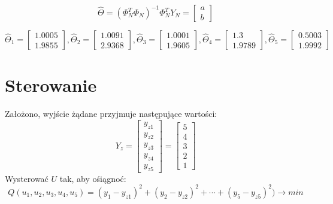 \documentclass{article}
\begin{document}
\begin{equation}
\widehat{\Theta} = (\Phi_N^T \Phi_N)^{-1} \Phi_N^T Y_N = \begin{bmatrix}
a \\  b
\end{bmatrix}
\end{equation}

\begin{equation}
\widehat{\Theta}_1 = \begin{bmatrix}
1.0005 \\ 1.9855
\end{bmatrix}
,
\widehat{\Theta}_2 = \begin{bmatrix}
1.0091 \\ 2.9368
\end{bmatrix}
,
\widehat{\Theta}_3 = \begin{bmatrix}
1.0001 \\ 1.9605
\end{bmatrix}
,
\widehat{\Theta}_4 = \begin{bmatrix}
1.3 \\ 1.9789
\end{bmatrix}
,
\widehat{\Theta}_5 = \begin{bmatrix}
0.5003 \\ 1.9992
\end{bmatrix}
\end{equation}

\section{Sterowanie}
Założono, wyjście żądane przyjmuje następujące wartości:
\begin{equation}
Y_{z} = \begin{bmatrix}
y_{z1} \\ y_{z2} \\ y_{z3} \\ y_{z4} \\ y_{z5}
\end{bmatrix}
= \begin{bmatrix}
5 \\ 4 \\ 3 \\ 2 \\ 1
\end{bmatrix}
\end{equation}
Wysterować \(U\) tak, aby ośiągnoć:
\begin{equation}
Q(u_1,u_2,u_3,u_4,u_5) = (y_1 - y_{z1})^2 + (y_2 - y_{z2})^2 + \cdots + (y_5 - y_{z5})^2 ) \rightarrow min
\end{equation}
\end{document}
